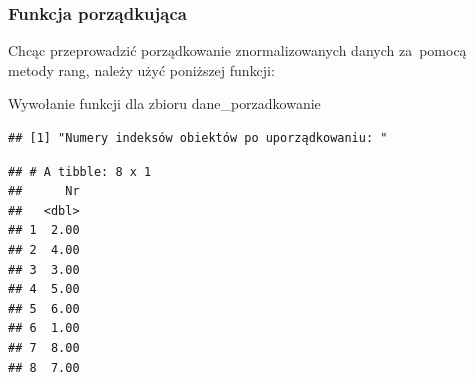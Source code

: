 \documentclass[12pt,a4paper]{report}
\begin{document}
{\subsubsection{Funkcja porządkująca}\label{funkcja-porzadkujaca-metoda-rang}
Chcąc przeprowadzić porządkowanie znormalizowanych danych za~pomocą metody rang, należy użyć poniższej funkcji:
\begin{Shaded}
\begin{Highlighting}[]
  \NormalTok{\{}
  \NormalTok{:}
  \NormalTok{\{}
    \NormalTok{x[}\NormalTok{]=}
  \NormalTok{\}}
  \NormalTok{x[,}\NormalTok{] <-} 
  \NormalTok{:}
  \NormalTok{\{}
    \NormalTok{):(}\NormalTok{))}
    \NormalTok{\{}
      \NormalTok{x[i,}\NormalTok{(x)]=x[i,}\NormalTok{(x)]+x[i,j]}
    \NormalTok{\}}
    \NormalTok{x[i,}\NormalTok{(x)]=x[i,}\NormalTok{(x)]/(}\NormalTok{)}
  \NormalTok{\}}
  \NormalTok{x<-x[}\NormalTok{(x$zmienna_syntetyczna),]}
  \NormalTok{(}\NormalTok{)}
  \NormalTok{(x[}\NormalTok{])}
\NormalTok{\}}
\end{Highlighting}
\end{Shaded}
Wywołanie funkcji dla zbioru dane\_porzadkowanie 
\begin{Shaded}
\begin{Highlighting}[]
\end{Highlighting}
\end{Shaded}
\begin{verbatim}
## [1] "Numery indeksów obiektów po uporządkowaniu: "
\end{verbatim}
\begin{verbatim}
## # A tibble: 8 x 1
##      Nr
##   <dbl>
## 1  2.00
## 2  4.00
## 3  3.00
## 4  5.00
## 5  6.00
## 6  1.00
## 7  8.00
## 8  7.00
\end{verbatim}

}
\end{document}
